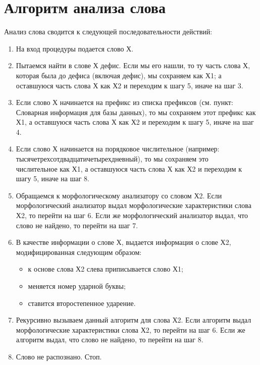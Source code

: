 \chapter{Алгоритм анализа слова} \label{chapt3}

Анализ слова сводится к следующей последовательности действий:

\begin{enumerate} 
    \item На вход процедуры подается слово Х.
    \item Пытаемся найти в слове Х дефис. Если мы его нашли, то ту часть слова Х, которая была до дефиса (включая дефис), мы сохраняем как Х1; а оставшуюся часть слова Х как Х2 и переходим к шагу 5, иначе на шаг 3.
    \item Если слово Х начинается на префикс из списка префиксов (см. пункт: Словарная информация для базы данных), то мы сохраняем этот префикс как Х1, а оставшуюся часть слова Х как Х2 и переходим к шагу 5, иначе на шаг 4.
    \item Если слово Х начинается на порядковое числительное (например: тысячетрехсотдвадцатичетырехдневный), то мы сохраняем это \\числительное как Х1, а оставшуюся часть слова Х как Х2 и переходим к шагу 5, иначе на шаг 8.
    \item Обращаемся к морфологическому анализатору со словом Х2. Если морфологический анализатор выдал морфологические характеристики слова Х2, то перейти на шаг 6. Если же морфологический анализатор выдал, что слово не найдено, то перейти на шаг 7.
    \item В качестве информации о слове Х, выдается информация о слове Х2, модифицированная следующим образом:
    \begin{itemize}
        \item к основе слова Х2 слева приписывается слово Х1;
    \end{itemize}
    \begin{itemize}
        \item меняется номер ударной буквы;
    \end{itemize}
    \begin{itemize}
        \item ставится второстепенное ударение.
    \end{itemize}
    \item Рекурсивно вызываем данный алгоритм для слова Х2. Если алгоритм выдал морфологические характеристики слова Х2, то перейти на шаг 6. Если же алгоритм выдал, что слово не найдено, то перейти на шаг 8.
    \item Слово не распознано. Стоп.
\end{enumerate}

\clearpage
